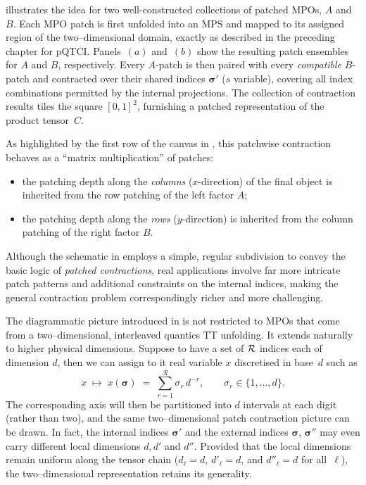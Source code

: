  illustrates the idea for two well-constructed collections of patched MPOs, \(A\) and \(B\).  
Each MPO patch is first unfolded into an MPS and mapped to its assigned region of the two–dimensional domain, exactly as described in the preceding chapter for pQTCI.  
Panels~$(a)$ and~$(b)$ show the resulting patch ensembles for \(A\) and \(B\), respectively.  
Every \(A\)-patch is then paired with every \emph{compatible} \(B\)-patch and contracted over their shared indices \(\boldsymbol{\sigma}'\) ($s$ variable), covering all index combinations permitted by the internal projections\footnotemark.
The collection of contraction results tiles the square
\([0,1]^{2}\), furnishing a patched representation of the product tensor~\(C\).

As highlighted by the first row of the canvas in , this patchwise contraction behaves as a ``matrix multiplication'' of patches:  
\begin{itemize}
    \item the patching depth along the \emph{columns} (\(x\)-direction) of the final
  object is inherited from the row patching of the left factor \(A\);  
  \item the patching depth along the \emph{rows} (\(y\)-direction) is inherited
  from the column patching of the right factor \(B\).
\end{itemize}
Although the schematic in  employs a simple, regular subdivision to convey the basic logic of \emph{patched contractions}, real applications involve far more intricate patch patterns and additional constraints on the internal indices, making the general contraction problem correspondingly richer and more challenging.

The diagrammatic picture introduced in  is not restricted to MPOs that come
from a two–dimensional, interleaved quantics TT unfolding.  
It extends naturally to higher physical dimensions.  
Suppose to have a set of $\mathcal{R}$ indices each of dimension $d$, then we can assign to it real variable $x$ discretised in base~\(d\) such as
\begin{equation}
  x \;\mapsto\; x(\boldsymbol{\sigma})
  \;=\;
  \sum_{r=1}^{\mathcal R}\sigma_{r}\,d^{-r},
  \qquad
  \sigma_{r}\in\{1,\dots,d\}.
\end{equation}
The corresponding axis will then be partitioned into \(d\) intervals at each digit (rather than two), and the same two–dimensional patch contraction picture can be drawn.  
In fact, the internal indices \(\boldsymbol{\sigma}'\) and the external indices \(\boldsymbol{\sigma}\), \(\boldsymbol{\sigma}''\) may even carry different local dimensions $d, d'$ and $d''$. Provided that the local dimensions remain uniform along the tensor chain (\(d_{\ell}=d\), \(d'_{\ell}=d\), and \(d''_{\ell}=d\) for all~\(\ell\)), the two–dimensional representation retains its generality.

